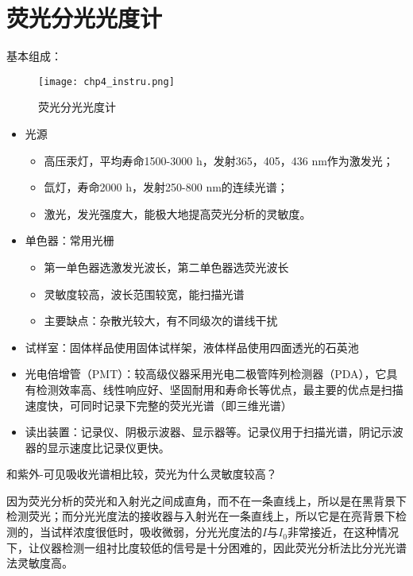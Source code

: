\section{荧光分光光度计}
基本组成： 
\begin{figure}[ht]
	\centering
	\texttt{[image: chp4\_instru.png]}
	\label{fig:chp4instru}
	\caption{荧光分光光度计}
\end{figure}
\begin{itemize}
	\item 光源
	\begin{itemize}
		\item 高压汞灯，平均寿命1500-3000 $\mathrm{h}$，发射365，405，436 $\mathrm{nm}$作为激发光；
		\item 氙灯，寿命2000 $\mathrm{h}$，发射250-800 $\mathrm{nm}$的连续光谱；
		\item 激光，发光强度大，能极大地提高荧光分析的灵敏度。
	\end{itemize}
	\item 单色器：常用光栅
	\begin{itemize}
		\item 第一单色器选激发光波长，第二单色器选荧光波长
		\item 灵敏度较高，波长范围较宽，能扫描光谱
		\item 主要缺点：杂散光较大，有不同级次的谱线干扰
	\end{itemize}
	\item 试样室：固体样品使用固体试样架，液体样品使用四面透光的石英池
	\item 光电倍增管（PMT）：较高级仪器采用光电二极管阵列检测器（PDA），它具有检测效率高、线性响应好、坚固耐用和寿命长等优点，最主要的优点是扫描速度快，可同时记录下完整的荧光光谱（即三维光谱）
	\item 读出装置：记录仪、阴极示波器、显示器等。记录仪用于扫描光谱，阴记示波器的显示速度比记录仪更快。
\end{itemize}

\begin{note}
	和紫外-可见吸收光谱相比较，荧光为什么灵敏度较高？

	因为荧光分析的荧光和入射光之间成直角，而不在一条直线上，所以是在黑背景下检测荧光；而分光光度法的接收器与入射光在一条直线上，所以它是在亮背景下检测的，当试样浓度很低时，吸收微弱，分光光度法的$I$与$I_{0}$非常接近，在这种情况下，让仪器检测一组衬比度较低的信号是十分困难的，因此荧光分析法比分光光谱法灵敏度高。
\end{note}
